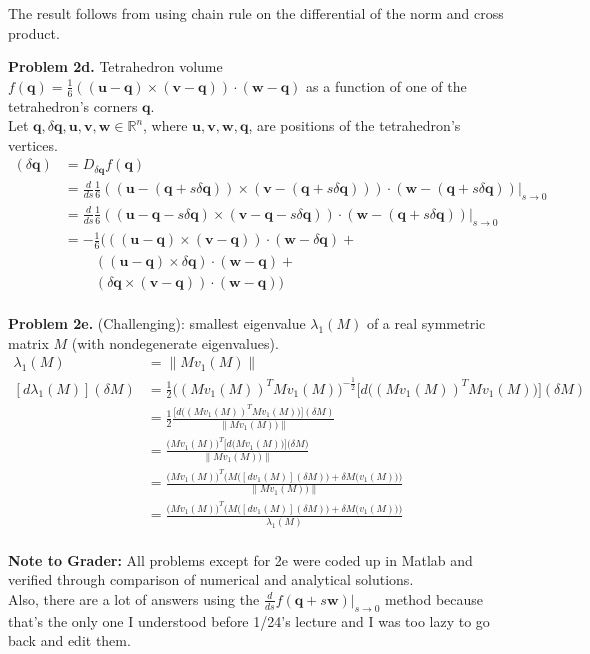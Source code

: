 \documentclass[11pt]{article}
\newcommand{\bq}{\mathbf{q}}
\newcommand{\bu}{\mathbf{u}}
\newcommand{\bv}{\mathbf{v}}
\newcommand{\bw}{\mathbf{w}}
\begin{document}
\noindent The result follows from using chain rule on the differential of the norm and cross product.

\pagebreak

\noindent \textbf{Problem 2d.}
Tetrahedron volume $f(\bq) = \frac{1}{6} ((\bu - \bq) \times (\bv-\bq)) \cdot (\bw -\bq)$ as a function of one of the tetrahedron's corners $\bq$. \\

\noindent Let $\bq, \delta \bq, \bu, \bv, \bw \in \mathbb{R}^n$, where $\bu, \bv, \bw, \bq$, are positions of the tetrahedron's vertices.
\begin{align*}
[df(\bq)](\delta \bq) 
    &= D_{\delta \bq} f(\bq) \\
    &= \frac{d}{ds} \frac{1}{6} ((\bu - (\bq + s \delta \bq)) \times (\bv - (\bq + s \delta \bq))) \cdot (\bw - (\bq + s \delta \bq)) \Big|_{s \to 0} \\
    &= \frac{d}{ds} \frac{1}{6} ((\bu - \bq - s \delta \bq) \times (\bv - \bq - s \delta \bq)) \cdot (\bw - (\bq + s \delta \bq)) \Big|_{s \to 0} \\
    &= - \frac{1}{6} \big(((\bu - \bq) \times (\bv - \bq)) \cdot (\bw - \delta \bq) + \\
    & \ \ \ \ \ \ \ \ \ \ ((\bu - \bq) \times \delta \bq) \cdot (\bw - \bq) + \\
    & \ \ \ \ \ \ \ \ \ \ (\delta \bq \times (\bv - \bq)) \cdot (\bw - \bq) \big) \\ 
\end{align*}

\noindent \textbf{Problem 2e.}
(Challenging): smallest eigenvalue $\lambda_1(M)$ of a real symmetric matrix $M$ (with nondegenerate eigenvalues).
\begin{align*}
\lambda_1(M)
    &= \|M v_1(M)\| \\
[d \lambda_1(M)](\delta M)
    &= \frac{1}{2} \Big((M v_1(M))^T M v_1(M)\Big)^{-\frac{1}{2}} \Big[d \Big((M v_1(M))^T M v_1(M)\Big)\Big](\delta M) \\
    &= \frac{1}{2} \frac{\Big[d \Big((M v_1(M))^T M v_1(M)\Big)\Big](\delta M)}{\|M v_1(M))\|} \\
    &= \frac{\Big(M v_1(M)\Big)^T \Big[d \big(M v_1(M)\big)\Big]\Big(\delta M\Big)}{\|M v_1(M))\|} \\
    &= \frac{\Big(M v_1(M)\Big)^T \Big(M\big([d v_1(M)](\delta M)\big) + \delta M \big(v_1(M)\big)\Big)}{\|M v_1(M))\|} \\
    &= \frac{\Big(M v_1(M)\Big)^T \Big(M\big([d v_1(M)](\delta M)\big) + \delta M \big(v_1(M)\big)\Big)}{\lambda_1(M)} \\
\end{align*}

\noindent \textbf{Note to Grader:}
All problems except for 2e were coded up in Matlab and verified through comparison of numerical and analytical solutions. \\

\noindent Also, there are a lot of answers using the $\frac{d}{ds} f(\bq + s \bw) \big|_{s \to 0}$ method because that's the only one I understood before 1/24's lecture and I was too lazy to go back and edit them.
\end{document}
